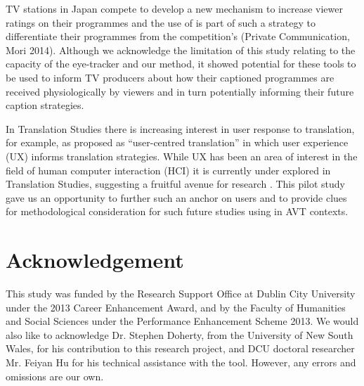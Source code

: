 \documentclass[output=paper]{langsci/langscibook}
\begin{document}
TV stations in Japan compete to develop a new mechanism to increase viewer ratings on their programmes and the use of  is part of such a strategy to differentiate their programmes from the competition's (Private Communication, Mori 2014). Although we acknowledge the limitation of this study relating to the capacity of the eye-tracker and our method, it showed potential for these tools to be used to inform TV producers about how their captioned programmes are received physiologically by viewers and in turn potentially informing their future caption strategies.  



In Translation Studies there is increasing interest in user response to translation, for example, as proposed as ``user-centred translation'' \citep{Suojanen2015} in which user experience (UX) informs translation strategies. While UX has been an area of interest in the field of human computer interaction (HCI) it is currently under explored in Translation Studies, suggesting a fruitful avenue for research \citep[312--318]{ohagan2013}. This pilot study gave us an opportunity to further such an anchor on users and to provide clues for methodological consideration for such future studies using  in AVT contexts. 


\section*{Acknowledgement}

This study was funded by the Research Support Office at Dublin City University under the 2013 Career Enhancement Award, and by the Faculty of Humanities and Social Sciences under the Performance Enhancement Scheme 2013. We would also like to acknowledge Dr. Stephen Doherty, from the University of New South Wales, for his contribution to this research project, and DCU doctoral researcher Mr. Feiyan Hu for his technical assistance with the  tool. However, any errors and omissions are our own. 
\end{document}

